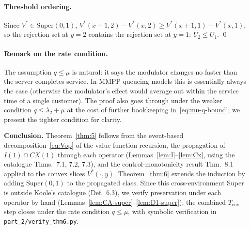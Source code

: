 \documentclass[11pt,a4paper]{article}
\newcommand{\Tenv}{T_{\mathrm{env}}}
\newcommand{\Cx}{CX}
\newcommand{\Iclass}{I}
\theoremstyle{definition}
\begin{document}
\paragraph{Threshold ordering.}
Since $V^* \in \mathrm{Super}(0, 1)$,
$V^*(x+1, 2) - V^*(x, 2) \ge V^*(x+1, 1) - V^*(x, 1)$, so the
rejection set at $y = 2$ contains the rejection set at $y = 1$:
$U_2 \le U_1$. \qed

\paragraph{Remark on the rate condition.}
The assumption $q \le \mu$ is natural: it says the modulator changes
no faster than the server completes service. In MMPP queueing
models this is essentially always the case (otherwise the
modulator's effect would average out within the service time of a
single customer). The proof also goes through under the weaker
condition $q \le \lambda_2 + \mu$ at the cost of further bookkeeping
in~\eqref{eq:mu-q-bound}; we present the tighter condition for
clarity.

\bigskip

\noindent\textbf{Conclusion.} Theorem~\ref{thm:5} follows from the
event-based decomposition~\eqref{eq:Vop} of the value function
recursion, the propagation of $\Iclass(1) \cap \Cx(1)$ through each
operator (Lemmas~\ref{lem:I}--\ref{lem:Cx}, using the catalogue
Thms.~7.1, 7.2, 7.3), and the control-monotonicity result Thm.~8.1
applied to the convex slices $V^*(\cdot, y)$.
Theorem~\ref{thm:6} extends the induction by adding
$\mathrm{Super}(0, 1)$ to the propagated class. Since this
cross-environment Super is outside Koole's catalogue
(Def.~6.3), we verify preservation under each operator by hand
(Lemmas~\ref{lem:CA-super}--\ref{lem:D1-super}); the combined
$\Tenv$ step closes under the rate condition $q \le \mu$, with
symbolic verification in \texttt{part\_2/verify\_thm6.py}.
\end{document}
